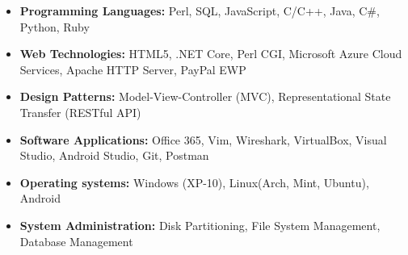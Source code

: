 \documentclass[letterpaper,10pt]{article}
\newlength{\listsep}
\begin{document}
\begin{itemize} \listsep
    \item {\bf Programming Languages:} Perl, SQL, JavaScript, C/C++, Java, C\#, Python, Ruby
    \item {\bf Web Technologies:} HTML5, .NET Core, Perl CGI, Microsoft Azure Cloud Services, Apache HTTP Server, PayPal EWP
    \item {\bf Design Patterns:} Model-View-Controller (MVC), Representational State Transfer (RESTful API)
    \item {\bf Software Applications:} Office 365, Vim, Wireshark, VirtualBox, Visual Studio, Android Studio, Git, Postman
    \item {\bf Operating systems:} Windows (XP-10), Linux(Arch, Mint, Ubuntu), Android
    \item {\bf System Administration:} Disk Partitioning, File System Management, Database Management
    
\end{itemize}
\end{document}
